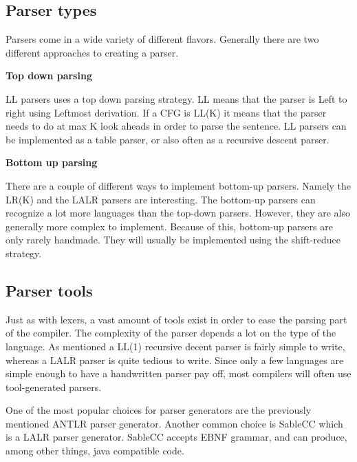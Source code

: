 \subsection{Parser types}

Parsers come in a wide variety of different flavors. 
Generally there are two different approaches to creating a parser.

\textbf{Top down parsing}

LL parsers uses a top down parsing strategy. 
LL means that the parser is Left to right using Leftmost derivation. 
If a CFG is LL(K) it means that the parser needs to do at max K look aheads in order to parse the sentence. 
LL parsers can be implemented as a table parser, or also often as a recursive descent parser. 

\textbf{Bottom up parsing}

There are a couple of different ways to implement bottom-up parsers. 
Namely the LR(K) and the LALR parsers are interesting. 
The bottom-up parsers can recognize a lot more languages than the top-down parsers.
However, they are also generally more complex to implement.
Because of this, bottom-up parsers are only rarely handmade.
They will usually be implemented using the shift-reduce strategy.

\subsection{Parser tools}

Just as with lexers, a vast amount of tools exist in order to ease the parsing part of the compiler. 
The complexity of the parser depends a lot on the type of the language. 
As mentioned a LL(1) recursive decent parser is fairly simple to write, whereas a LALR parser is quite tedious to write. 
Since only a few languages are simple enough to have a handwritten parser pay off, most compilers will often use tool-generated parsers.

One of the most popular choices for parser generators are the previously mentioned ANTLR parser generator. 
Another common choice is SableCC which is a LALR parser generator.
SableCC accepts EBNF grammar, and can produce, among other things, java compatible code.
